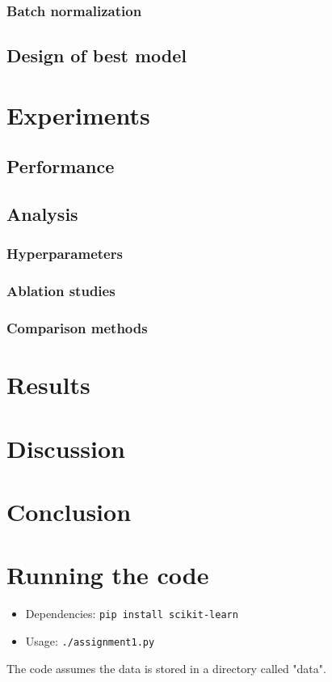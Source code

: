 \documentclass{article}
\begin{document}
\subsubsection{Batch normalization}
\subsection{Design of best model}

\section{Experiments}
\subsection{Performance}
\subsection{Analysis}
\subsubsection{Hyperparameters}
\subsubsection{Ablation studies}
\subsubsection{Comparison methods}

\section{Results}

\section{Discussion}

\section{Conclusion}

\appendix
\section{Running the code}
\begin{itemize}
\item Dependencies: \texttt{pip install scikit-learn}
\item Usage: \texttt{./assignment1.py}
\end{itemize}
The code assumes the data is stored in a directory called "data".
\end{document}
